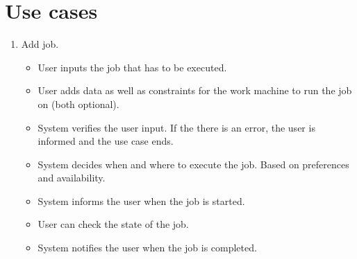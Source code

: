 \section{Use cases}
\begin{enumerate}
  \item Add job.
  \begin{itemize}
    \item User inputs the job that has to be executed.
    \item User adds data as well as constraints for the work machine to run the job on (both optional).
    \item System verifies the user input.
    If the there is an error, the user is informed and the use case ends.
    \item System decides when and where to execute the job.
    Based on preferences and availability.
    \item System informs the user when the job is started.
    \item User can check the state of the job.
    \item System notifies the user when the job is completed.
  \end{itemize}
\end{enumerate}
